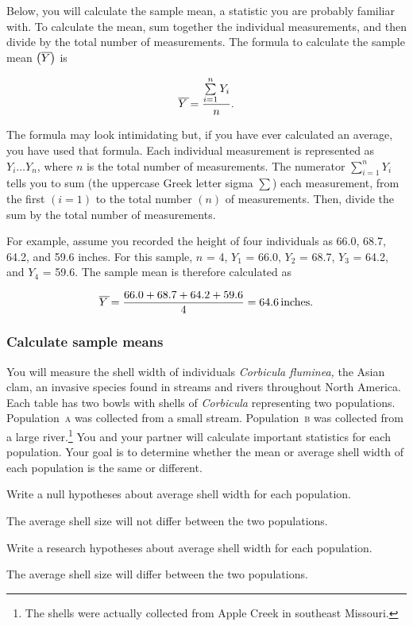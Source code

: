 \documentclass[12pt]{exam}
\newcommand*\AnswerBox[2]{%
    \parbox[t][#1]{0.92\textwidth}{%
    \begin{solution}#2\end{solution}}
}
\newcommand*\meanY{\overline{Y\kern1.67pt}\kern-1.67pt}
\newcommand*\Popa{Population~\textsc{a}}
\newcommand*\Popb{Population~\textsc{b}}
\newcommand*\Corbicula{\textit{Corbicula}}
\begin{document}
\begin{questions}
Below, you will calculate the sample mean, a statistic you are probably familiar with. 
To calculate the mean, sum together the individual measurements, and then divide by the total number
of measurements. The formula to calculate the sample mean $\left(\meanY \right)$ is

\[ \meanY = \frac{\sum\limits^n_{i=1} Y_i}{n}. \]

The formula may look intimidating but, if you have ever calculated an 
average, you have used that formula. Each individual measurement is represented as $Y_i \dots Y_n$, 
where $n$ is the total number of measurements. The numerator $\sum^n_{i=1} Y_i$ tells you to sum (the uppercase Greek letter sigma $\textstyle\sum$) each measurement, from the first 
$(i=1)$ to the total number $(n)$ of measurements. Then, divide the sum by the 
total number of measurements.

For example, assume you recorded the height of four individuals as 
66.0, 68.7, 64.2, and 59.6 inches. For this sample, $n$ = 4, $Y_1$ = 66.0, 
$Y_2$ = 68.7, $Y_3$ = 64.2, and $Y_4$ = 59.6. The sample mean is therefore calculated as

\[ \meanY = \frac{66.0 + 68.7 + 64.2 + 59.6}{4} = 64.6\,\mathrm{inches.} \]

\subsubsection*{Calculate sample means}

You will measure the shell width of individuals
\textit{Corbicula fluminea,} the Asian clam, an invasive species 
found in streams and rivers throughout North America. Each table has
two bowls with shells of \Corbicula{} representing two populations.
\Popa{} was collected from a small stream. \Popb{}
was collected from a large river.\footnote{The shells were actually collected from 
Apple Creek in southeast Missouri.} You
and your partner will calculate important statistics for each population.
Your goal is to determine whether the mean or average shell width
of each population is the same or different.

\question
Write a null hypotheses about average shell width for each population.

\AnswerBox{2\baselineskip}{The average shell size will not differ between the two populations.}

\question
Write a research hypotheses about average shell width for each population.

\AnswerBox{2\baselineskip}{The average shell size will differ between the two populations.}


\end{questions}
\end{document}
